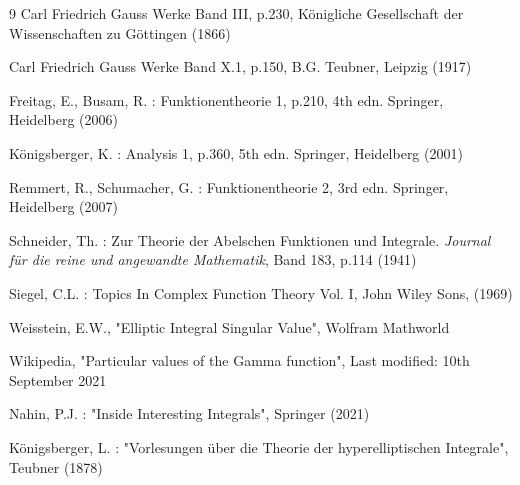 \documentclass[sn-mathphys]{sn-jnl}%
\theoremstyle{thmstyleone}%
\theoremstyle{thmstyletwo}%
\theoremstyle{thmstylethree}%
\begin{document}
\begin{thebibliography}{9}
Carl Friedrich Gauss Werke Band III, p.230, Königliche Gesellschaft der Wissenschaften zu Göttingen (1866)

Carl Friedrich Gauss Werke Band X.1, p.150, B.G. Teubner, Leipzig (1917)

Freitag, E., Busam, R. : Funktionentheorie 1, p.210, 4th edn. Springer, Heidelberg (2006)

Königsberger, K. : Analysis 1, p.360, 5th edn. Springer, Heidelberg (2001)

Remmert, R., Schumacher, G. : Funktionentheorie 2, 3rd edn. Springer, Heidelberg (2007)

Schneider, Th. : Zur Theorie der Abelschen Funktionen und Integrale. \textit{Journal für die reine und angewandte Mathematik}, Band 183, p.114 (1941)

Siegel, C.L. : Topics In Complex Function Theory Vol. I, John Wiley Sons, (1969)

Weisstein, E.W., "Elliptic Integral Singular Value", Wolfram Mathworld 

Wikipedia, "Particular values of the Gamma function", Last modified: 10th September 2021

Nahin, P.J. : "Inside Interesting Integrals", Springer (2021)

Königsberger, L. : "Vorlesungen über die Theorie der hyperelliptischen Integrale", Teubner (1878)
\end{thebibliography}
\end{document}
